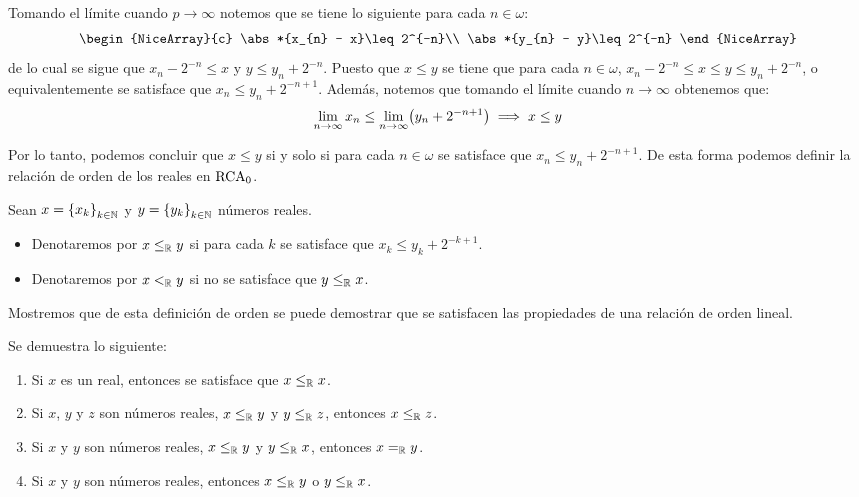 Tomando el límite cuando $p\to\infty$ notemos que se tiene lo siguiente para cada $n\in\omega$:
\[
	\begin{NiceArray}{c}
		\abs*{x_{n} - x}\leq 2^{-n}\\
		\abs*{y_{n} - y}\leq 2^{-n}
	\end{NiceArray}
\]
de lo cual se sigue que $x_{n} - 2^{-n}\leq x$ y $y\leq y_{n} + 2^{-n}$. Puesto que $x\leq y$ se tiene que para cada $n\in\omega$, $x_{n} - 2^{-n}\leq x\leq y\leq y_{n} + 2^{-n}$, o equivalentemente se satisface que $x_{n}\leq y_{n} + 2^{-n + 1}$. Además, notemos que tomando el límite cuando $n\to\infty$ obtenemos que:
\[
	\lim_{n\to\infty} x_{n}\leq\lim_{n\to\infty}\pa*{y_{n} + 2^{-n + 1}}\implies x\leq y
\]

Por lo tanto, podemos concluir que $x\leq y$ si y solo si para cada $n\in\omega$ se satisface que $x_{n}\leq y_{n} + 2^{-n + 1}$. De esta forma podemos definir la relación de orden de los reales en $\RCA$.

\begin{definition}[Orden en $\RR$]
	Sean $x =\set*{x_{k}}_{k\in\NN}$ y $y =\set*{y_{k}}_{k\in\NN}$ números reales.

	\begin{itemize}
		\item Denotaremos por $x\leq_{\RR} y$ si para cada $k$ se satisface que $x_{k}\leq y_{k} + 2^{-k + 1}$.

		\item Denotaremos por $x <_{\RR} y$ si no se satisface que $y\leq_{\RR}x$.
	\end{itemize}
\end{definition}

Mostremos que de esta definición de orden se puede demostrar que se satisfacen las propiedades de una relación de orden lineal.

\begin{theorem}
	Se demuestra lo siguiente:

	\begin{enumerate}
		\item Si $x$ es un real, entonces se satisface que $x\leq_{\RR} x$.
		\item Si $x$, $y$ y $z$ son números reales, $x\leq_{\RR} y$ y $y\leq_{\RR} z$, entonces $x\leq_{\RR} z$.
		\item Si $x$ y $y$ son números reales, $x\leq_{\RR} y$ y $y\leq_{\RR} x$, entonces $x =_{\RR} y$.
		\item Si $x$ y $y$ son números reales, entonces $x\leq_{\RR} y$ o $y\leq_{\RR} x$.
	\end{enumerate}
\end{theorem}

